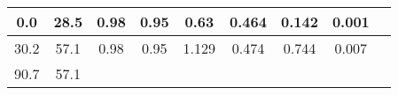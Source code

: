\documentclass[a4paper,10pt]{article}
\begin{document}
\begin{longtable}{
     |
%    
    c|
%    
    c|
%    
    c|
%    
    c|
%    
    c|
%    
    c|
%    
    c|
%    
    c|
%    
    c|
%    
    }
        

%        

%        
        0.0
%        

%        

%        
        & 28.5
%        

%        

%        
        & 0.98
%        

%        

%        
        & 0.95
%        

%        

%        
        & 0.63
%        

%        

%        
        & 0.464
%        

%        

%        
        & 0.142
%        

%        

%        
        & 0.001
%        

%        
        \\
        \hline

        

%        

%        
        30.2
%        

%        

%        
        & 57.1
%        

%        

%        
        & 0.98
%        

%        

%        
        & 0.95
%        

%        

%        
        & 1.129
%        

%        

%        
        & 0.474
%        

%        

%        
        & 0.744
%        

%        

%        
        & 0.007
%        

%        
        \\
        \hline

        

%        

%        
        90.7
%        

%        

%        
        & 57.1
%        


\end{longtable}
\end{document}
